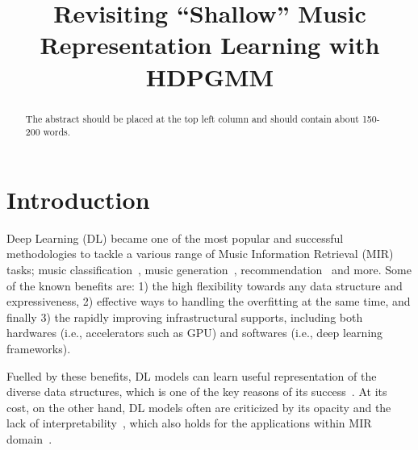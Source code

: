 \documentclass{article}
\title{Revisiting ``Shallow'' Music Representation Learning with HDPGMM}
\begin{document}
%
\maketitle
%
\begin{abstract}
The abstract should be placed at the top left column and should contain about 150-200 words.
\end{abstract}
%
\section{Introduction}\label{sec:introduction}


Deep Learning (DL) became one of the most popular and successful methodologies to tackle a various range of Music Information Retrieval (MIR) tasks; music classification~\cite{musicclassification:book}, music generation~\cite{briot2019deep}, recommendation~\cite{10.3389/fams.2019.00044} and more. Some of the known benefits are: 1) the high flexibility towards any data structure and expressiveness, 2) effective ways to handling the overfitting at the same time, and finally 3) the rapidly improving infrastructural supports, including both hardwares (i.e., accelerators such as GPU) and softwares (i.e., deep learning frameworks).

Fuelled by these benefits, DL models can learn useful representation of the diverse data structures, which is one of the key reasons of its success~\cite{DBLP:conf/ismir/HumphreyBL12}. At its cost, on the other hand, DL models often are criticized by its opacity and the lack of interpretability~\cite{DBLP:conf/dsaa/GilpinBYBSK18}, which also holds for the applications within MIR domain~\cite{DBLP:journals/tmm/Sturm14,DBLP:journals/cie/Sturm16}.
\end{document}
